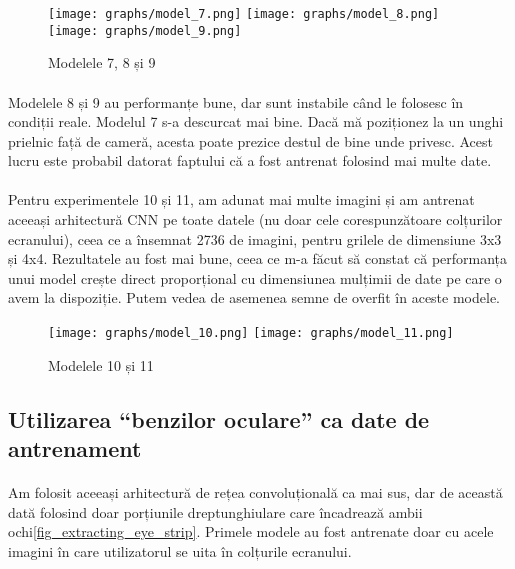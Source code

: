 \begin{figure}[h]
    \centering
    \texttt{[image: graphs/model\_7.png]}
    \texttt{[image: graphs/model\_8.png]}
    \texttt{[image: graphs/model\_9.png]}
    \caption{Modelele 7, 8 și 9}
\end{figure}

\paragraph{}
Modelele 8 și 9 au performanțe bune, dar sunt instabile când le folosesc în condiții reale.
Modelul 7 s-a descurcat mai bine.
Dacă mă poziționez la un unghi prielnic față de cameră, acesta poate prezice destul de bine unde privesc.
Acest lucru este probabil datorat faptului că a fost antrenat folosind mai multe date.

\paragraph{}
Pentru experimentele 10 și 11, am adunat mai multe imagini și am antrenat aceeași arhitectură CNN pe toate datele (nu doar cele corespunzătoare colțurilor ecranului), ceea ce a însemnat 2736 de imagini, pentru grilele de dimensiune 3x3 și 4x4.
Rezultatele au fost mai bune, ceea ce m-a făcut să constat că performanța unui model crește direct proporțional cu dimensiunea mulțimii de date pe care o avem la dispoziție.
Putem vedea de asemenea semne de overfit în aceste modele.

\begin{figure}
    \centering
    \texttt{[image: graphs/model\_10.png]}
    \texttt{[image: graphs/model\_11.png]}
    \caption{Modelele 10 și 11}
\end{figure}

\subsection{Utilizarea ``benzilor oculare'' ca date de antrenament}
\paragraph{}
Am folosit aceeași arhitectură de rețea convoluțională ca mai sus, dar de această dată folosind doar porțiunile dreptunghiulare care încadrează ambii ochi\ref{fig_extracting_eye_strip}.
Primele modele au fost antrenate doar cu acele imagini în care utilizatorul se uita în colțurile ecranului.


